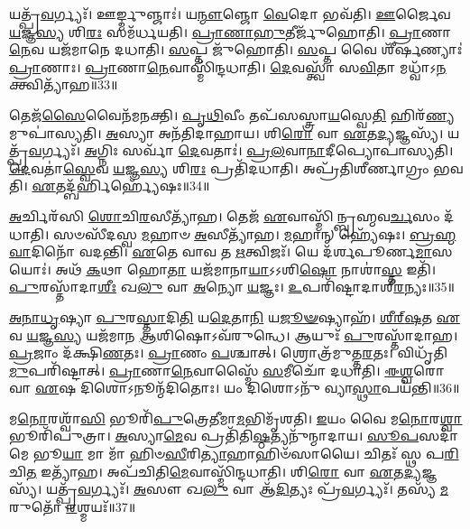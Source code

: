 𑌯𑌤𑍍𑌪𑍍𑌰᳴\-\ul{𑌵}\-𑌰𑍍𑌗𑍍𑌯𑌃᳴। 
𑌊𑌰𑍍𑌙𑍍𑌮𑍁𑌞𑍍𑌜𑌾𑌃॑। 
𑌯\-\ul{𑌨𑍍𑌮𑍗}\-𑌞𑍍𑌜𑍋 \ul{𑌵𑍇}\-𑌦𑍋 𑌭𑌵᳴𑌤𑌿। 
\-\ul{𑌊}\-𑌰𑍍𑌜𑍈𑌵 \ul{𑌯}\-𑌜𑍍𑌞\-\ul{𑌸𑍍𑌯} 𑌶𑌿\-\ul{𑌰𑌃} 𑌸𑌮᳴𑌰𑍍𑌧𑌯𑌤𑌿। 
\-\ul{𑌪𑍍𑌰𑌾}\-\-\ul{𑌣𑌾}\-\-\ul{𑌹𑍁}\-𑌤𑍀𑌰𑍍𑌜𑍁᳴𑌹𑍋𑌤𑌿। 
\-\ul{𑌪𑍍𑌰𑌾}\-𑌣𑌾\-\ul{𑌨𑍇}\-𑌵 𑌯𑌜᳴𑌮𑌾𑌨𑍇 𑌦𑌧𑌾𑌤𑌿। 
\-\ul{𑌸}\-𑌪𑍍𑌤 𑌜𑍁᳴𑌹𑍋𑌤𑌿। 
\-\ul{𑌸}\-𑌪𑍍𑌤 𑌵𑍈 𑌶𑍀᳴𑌰𑍍\mbox{}\-\ul{𑌷}\-𑌣𑍍𑌯𑌾𑌃॑ \ul{𑌪𑍍𑌰𑌾}\-𑌣𑌾𑌃। 
\-\ul{𑌪𑍍𑌰𑌾}\-𑌣𑌾\-\ul{𑌨𑍇}\-𑌵𑌾𑌸𑍍𑌮𑌿᳴𑌨𑍍𑌦𑌧𑌾𑌤𑌿। 
\-\ul{𑌦𑍇}\-𑌵𑌸𑍍𑌤𑍍𑌵𑌾᳴ 𑌸\-\ul{𑌵𑌿}\-𑌤𑌾 𑌮𑌧𑍍𑌵𑌾᳴𑌽\-\ul{𑌨}\-𑌕𑍍𑌤𑍍𑌵𑌿𑌤𑍍𑌯𑌾᳴𑌹॥33॥

𑌤𑍇𑌜᳴\-\ul{𑌸𑍈}\-𑌵𑍈𑌨᳴𑌮𑌨𑌕𑍍𑌤𑌿। 
\-\ul{𑌪𑍃}\-\-\ul{𑌥𑌿}\-𑌵𑍀𑌂 𑌤𑌪᳴𑌸𑌸𑍍𑌤𑍍𑌰𑌾\-\ul{𑌯}\-𑌸𑍍𑌵𑍇\-\ul{𑌤𑌿} 𑌹𑌿𑌰᳴\-\ul{𑌣𑍍𑌯}\-𑌮𑍁𑌪𑌾॑\-𑌸𑍍𑌯𑌤𑌿। 
\-\ul{𑌅}\-𑌸𑍍𑌯𑌾 𑌅𑌨᳴𑌤𑌿𑌦𑌾𑌹𑌾𑌯। 
𑌶𑌿\-\ul{𑌰𑍋} 𑌵𑌾 \ul{𑌏}\-𑌤\-\ul{𑌦𑍍𑌯}\-𑌜𑍍𑌞𑌸𑍍𑌯᳴। 
𑌯𑌤𑍍𑌪𑍍𑌰᳴\-\ul{𑌵}\-𑌰𑍍𑌗𑍍𑌯𑌃᳴। 
\-\ul{𑌅}\-𑌗𑍍𑌨𑌿𑌃 𑌸𑌰𑍍𑌵𑌾᳴ \ul{𑌦𑍇}\-𑌵𑌤𑌾𑌃॑। 
\-\ul{𑌪𑍍𑌰}\-\-\ul{𑌲}\-𑌵𑌾\-\ul{𑌨𑌾}\-𑌦𑍀𑌪𑍍𑌯𑍋𑌪𑌾॑𑌸𑍍𑌯𑌤𑌿। 
\-\ul{𑌦𑍇}\-𑌵𑌤𑌾॑\-\ul{𑌸𑍍𑌵𑍇}\-𑌵 \ul{𑌯}\-𑌜𑍍𑌞\-\ul{𑌸𑍍𑌯} 𑌶𑌿\-\ul{𑌰𑌃} 𑌪𑍍𑌰𑌤𑌿᳴𑌦𑌧𑌾𑌤𑌿। 
𑌅𑌪𑍍𑌰᳴𑌤𑌿𑌶𑍀𑌰𑍍𑌣𑌾𑌗𑍍𑌰𑌂 𑌭𑌵𑌤𑌿। 
\-\ul{𑌏}\-𑌤𑌦𑍍𑌬᳴𑌰𑍍\mbox{}\-\ul{𑌹𑌿}\-𑌰𑍍\mbox{}𑌹𑍍𑌯𑍇᳴𑌷𑌃॥34॥

\-\ul{𑌅}\-𑌰𑍍𑌚𑌿𑌰᳴𑌸𑌿 \ul{𑌶𑍋}\-𑌚𑌿\-\ul{𑌰}\-𑌸𑍀𑌤𑍍𑌯𑌾᳴𑌹। 
𑌤𑍇𑌜᳴ \ul{𑌏}\-𑌵𑌾𑌸𑍍𑌮𑌿᳴𑌨𑍍𑌬𑍍𑌰𑌹𑍍𑌮𑌵\-\ul{𑌰𑍍𑌚}\-𑌸𑌂 𑌦᳴𑌧𑌾𑌤𑌿। 
𑌸𑍞𑌸𑍀᳴𑌦𑌸𑍍𑌵 \ul{𑌮}\-𑌹𑌾𑍞 \ul{𑌅}\-𑌸𑍀𑌤𑍍𑌯𑌾᳴𑌹। 
\-\ul{𑌮}\-𑌹𑌾𑌨𑍍 𑌹𑍍𑌯𑍇᳴𑌷𑌃। 
\-\ul{𑌬𑍍𑌰}\-\-\ul{𑌹𑍍𑌮}\-\-\ul{𑌵𑌾}\-𑌦𑌿𑌨𑍋᳴ 𑌵𑌦𑌨𑍍𑌤𑌿। 
\-\ul{𑌏}\-𑌤𑍇 𑌵𑌾𑌵 𑌤 \ul{𑌋}\-𑌤𑍍𑌵𑌿𑌜𑌃᳴। 
𑌯𑍇 𑌦᳴𑌰𑍍\mbox{}𑌶𑌪𑍂𑌰𑍍𑌣\-\ul{𑌮𑌾}\-𑌸𑌯𑍋𑌃॑। 
𑌅𑌥᳴ \ul{𑌕}\-𑌥𑌾 𑌹𑍋\-\ul{𑌤𑌾} 𑌯𑌜᳴𑌮𑌾𑌨𑌾\-\ul{𑌯𑌾}\-𑌽𑌽𑌶𑌿\-\ul{𑌷𑍋} 𑌨𑌾𑌶𑌾॑\-\ul{𑌸𑍍𑌤} 𑌇𑌤𑌿᳴। 
\-\ul{𑌪𑍁}\-𑌰𑌸𑍍𑌤𑌾᳴𑌦𑌾\-\ul{𑌶𑍀𑌃} 𑌖\-\ul{𑌲𑍁} 𑌵𑌾 \ul{𑌅}\-𑌨𑍍𑌯𑍋 \ul{𑌯}\-𑌜𑍍𑌞𑌃। 
\-\ul{𑌉}\-𑌪𑌰𑌿᳴𑌷𑍍𑌟𑌾𑌦𑌾𑌶𑍀\-\ul{𑌰}\-𑌨𑍍𑌯𑌃॥35॥

\-\ul{𑌅}\-\-\ul{𑌨𑌾}\-\-\ul{𑌧𑍃}\-𑌷𑍍𑌯𑌾 \ul{𑌪𑍁}\-𑌰\-\ul{𑌸𑍍𑌤𑌾}\-𑌦𑌿\-\ul{𑌤𑌿} 𑌯\-\ul{𑌦𑍇}\-𑌤𑌾\-\ul{𑌨𑌿} 𑌯\-\ul{𑌜𑍂}\-\-\ul{𑍟}\-𑌷𑍍𑌯𑌾𑌹᳴। 
\-\ul{𑌶𑍀}\-\-\ul{𑌰𑍍}\-‌\-\ul{𑌷}\-𑌤 \ul{𑌏}\-𑌵 \ul{𑌯}\-𑌜𑍍𑌞\-\ul{𑌸𑍍𑌯} 𑌯𑌜᳴𑌮𑌾𑌨 \ul{𑌆}\-𑌶𑌿𑌷𑍋𑌽𑌵᳴𑌰𑍁𑌨𑍍𑌧𑍇। 
𑌆𑌯𑍁𑌃᳴ \ul{𑌪𑍁}\-𑌰𑌸𑍍𑌤𑌾᳴𑌦𑌾𑌹। 
\-\ul{𑌪𑍍𑌰}\-𑌜𑌾𑌂 𑌦᳴𑌕𑍍𑌷𑌿\-\ul{𑌣}\-𑌤𑌃। 
\-\ul{𑌪𑍍𑌰𑌾}\-𑌣𑌂 \ul{𑌪}\-𑌶𑍍𑌚𑌾𑌤𑍍। 
𑌶𑍍𑌰𑍋𑌤𑍍𑌰᳴𑌮𑍁𑌤𑍍𑌤\-\ul{𑌰}\-𑌤𑌃। 
𑌵𑌿𑌧𑍃᳴𑌤𑌿\-\ul{𑌮𑍁}\-𑌪𑌰𑌿᳴𑌷𑍍𑌟𑌾𑌤𑍍। 
\-\ul{𑌪𑍍𑌰𑌾}\-𑌣𑌾\-\ul{𑌨𑍇}\-𑌵𑌾𑌸𑍍𑌮𑍈᳴ \ul{𑌸}\-𑌮𑍀𑌚𑍋᳴ 𑌦𑌧𑌾𑌤𑌿। 
\-\ul{𑌈}\-\-\ul{𑌶𑍍𑌵}\-𑌰𑍋 𑌵𑌾 \ul{𑌏}\-𑌷 𑌦𑌿𑌶𑍋𑌽𑌨𑍂𑌨𑍍𑌮᳴𑌦𑌿𑌤𑍋𑌃। 
𑌯𑌂 𑌦𑌿𑌶𑍋𑌽𑌨𑍁᳴ 𑌵𑍍𑌯𑌾\-\ul{𑌸𑍍𑌥𑌾}\-𑌪𑌯᳴𑌨𑍍𑌤𑌿॥36॥

𑌮\-\ul{𑌨𑍋}\-𑌰𑌶𑍍𑌵𑌾᳴\-\ul{𑌸𑌿} 𑌭𑍂𑌰𑌿᳴\-\ul{𑌪𑍁}\-𑌤𑍍𑌰𑍇\-\ul{𑌤𑍀}\-𑌮𑌾\-\ul{𑌮}\-𑌭𑌿𑌮𑍃᳴𑌶𑌤𑌿। 
\-\ul{𑌇}\-𑌯𑌂 𑌵𑍈 𑌮\-\ul{𑌨𑍋}\-𑌰\-\ul{𑌶𑍍𑌵𑌾} 𑌭𑍂𑌰𑌿᳴𑌪𑍁𑌤𑍍𑌰𑌾। 
\-\ul{𑌅}\-𑌸𑍍𑌯𑌾\-\ul{𑌮𑍇}\-𑌵 𑌪𑍍𑌰𑌤𑌿᳴𑌤𑌿\-\ul{𑌷𑍍𑌠}\-𑌤𑍍𑌯𑌨𑍁᳴𑌨𑍍𑌮𑌾𑌦𑌾𑌯। 
\-\ul{𑌸𑍂}\-\-\ul{𑌪}\-𑌸𑌦𑌾᳴ 𑌮𑍇 𑌭𑍂\-\ul{𑌯𑌾} 𑌮𑌾 𑌮𑌾᳴ 𑌹𑌿𑍞\-\ul{𑌸𑍀}\-𑌰𑌿\-\ul{𑌤𑍍𑌯𑌾}\-𑌹𑌾𑌹𑌿𑍞᳴𑌸𑌾𑌯𑍈। 
𑌚𑌿𑌤𑌃᳴ 𑌸𑍍𑌥 𑌪\-\ul{𑌰𑌿}\-𑌚𑌿\-\ul{𑌤} 𑌇𑌤𑍍𑌯𑌾᳴𑌹। 
𑌅𑌪᳴𑌚𑌿𑌤𑌿\-\ul{𑌮𑍇}\-𑌵𑌾𑌸𑍍𑌮𑌿᳴𑌨𑍍𑌦𑌧𑌾𑌤𑌿। 
𑌶𑌿\-\ul{𑌰𑍋} 𑌵𑌾 \ul{𑌏}\-𑌤\-\ul{𑌦𑍍𑌯}\-𑌜𑍍𑌞𑌸𑍍𑌯᳴। 
𑌯𑌤𑍍𑌪𑍍𑌰᳴\-\ul{𑌵}\-𑌰𑍍𑌗𑍍𑌯𑌃᳴। 
\-\ul{𑌅}\-𑌸𑍗 𑌖\-\ul{𑌲𑍁} 𑌵𑌾 𑌆᳴\-\ul{𑌦𑌿}\-𑌤𑍍𑌯𑌃 𑌪𑍍𑌰᳴\-\ul{𑌵}\-𑌰𑍍𑌗𑍍𑌯𑌃᳴। 
𑌤𑌸𑍍𑌯᳴ \ul{𑌮}\-𑌰𑍁𑌤𑍋᳴ \ul{𑌰}\-𑌶𑍍𑌮𑌯𑌃᳴॥37॥

